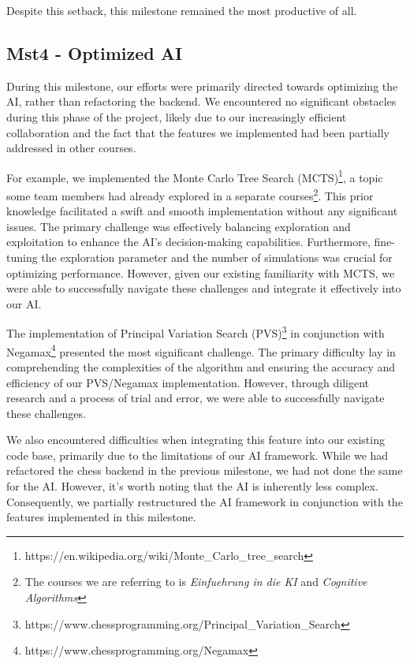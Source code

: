 Despite this setback, this milestone remained the most productive of all.

\subsection{Mst4 - Optimized AI}

During this milestone, our efforts were primarily directed towards optimizing the AI, rather than refactoring the backend. We encountered no significant obstacles during this phase of the project, likely due to our increasingly efficient collaboration and the fact that the features we implemented had been partially addressed in other courses.

For example, we implemented the Monte Carlo Tree Search (MCTS)\footnote{https://en.wikipedia.org/wiki/Monte\_Carlo\_tree\_search}, a topic some team members had already explored in a separate courses\footnote{The courses we are referring to is \textit{Einfuehrung in die KI}
and \textit{Cognitive Algorithms}}. This prior knowledge facilitated a swift and smooth implementation without any significant issues. The primary challenge was effectively balancing exploration and exploitation to enhance the AI's decision-making capabilities. Furthermore, fine-tuning the exploration parameter and the number of simulations was crucial for optimizing performance. However, given our existing familiarity with MCTS, we were able to successfully navigate these challenges and integrate it effectively into our AI.

The implementation of Principal Variation Search (PVS)\footnote{https://www.chessprogramming.org/Principal\_Variation\_Search} in conjunction with Negamax\footnote{https://www.chessprogramming.org/Negamax} presented the most significant challenge. The primary difficulty lay in comprehending the complexities of the algorithm and ensuring the accuracy and efficiency of our PVS/Negamax implementation. However, through diligent research and a process of trial and error, we were able to successfully navigate these challenges.

We also encountered difficulties when integrating this feature into our existing code base, primarily due to the limitations of our AI framework. While we had refactored the chess backend in the previous milestone, we had not done the same for the AI. However, it's worth noting that the AI is inherently less complex. Consequently, we partially restructured the AI framework in conjunction with the features implemented in this milestone.

